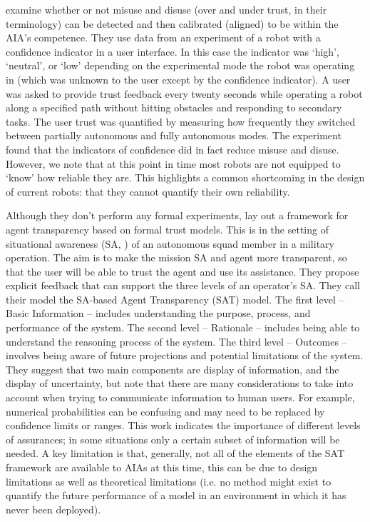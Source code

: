\citet{Kaniarasu2013-ho} examine whether or not misuse and disuse (over and under trust, in their terminology) can be detected and then calibrated (aligned) to be within the AIA's competence. They use data from an experiment of a robot with a confidence indicator in a user interface. In this case the indicator was `high', `neutral', or `low' depending on the experimental mode the robot was operating in (which was unknown to the user except by the confidence indicator). A user was asked to provide trust feedback every twenty seconds while operating a robot along a specified path without hitting obstacles and responding to secondary tasks. The user trust was quantified by measuring how frequently they switched between partially autonomous and fully autonomous modes. The experiment found that the indicators of confidence did in fact reduce misuse and disuse. However, we note that at this point in time most robots are not equipped to `know' how reliable they are. This highlights a common shortcoming in the design of current robots: that they cannot quantify their own reliability.

Although they don't perform any formal experiments, \citet{Chen2014-dk} lay out a framework for agent transparency based on formal trust models. This is in the setting of situational awareness (SA, \cite{Endsley1995-ie}) of an autonomous squad member in a military operation. The aim is to make the mission SA and agent more transparent, so that the user will be able to trust the agent and use its assistance. They propose explicit feedback that can support the three levels of an operator's SA. They call their model the SA-based Agent Transparency (SAT) model. The first level -- Basic Information -- includes understanding the purpose, process, and performance of the system. The second level -- Rationale -- includes being able to understand the reasoning process of the system. The third level -- Outcomes -- involves being aware of future projections and potential limitations of the system. They suggest that two main components are display of information, and the display of uncertainty, but note that there are many considerations to take into account when trying to communicate information to human users. For example, numerical probabilities can be confusing and may need to be replaced by confidence limits or ranges. This work indicates the importance of different levels of assurances; in some situations only a certain subset of information will be needed. A key limitation is that, generally, not all of the elements of the SAT framework are available to AIAs at this time, this can be due to design limitations as well as theoretical limitations (i.e. no method might exist to quantify the future performance of a model in an environment in which it has never been deployed).

